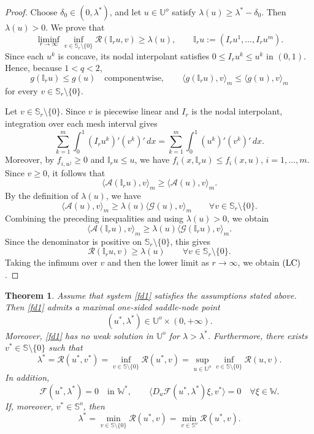 \documentclass[preprint,10pt]{elsarticle}
\numberwithin{equation}{section}
\newtheorem{thm}{Theorem}[section]
\begin{document}
\begin{proof}
	Choose \(\delta_0\in(0,\lambda^*)\), and let
	\(u\in\mathbb U^o\) satisfy \(\lambda(u)\ge\lambda^*-\delta_0\).
	Then \(\lambda(u)>0\). We prove that
	\[
	\liminf_{r\to\infty}
	\inf_{v\in\mathbb S_r\setminus\{0\}}
	\mathcal R(\mathbb I_ru,v)
	\ge\lambda(u),
	\qquad
	\mathbb I_ru:=(I_ru^1,\ldots,I_ru^m).
	\]
	Since each \(u^k\) is concave, its nodal interpolant satisfies
	\(0\le I_ru^k\le u^k\) in \((0,1)\). Hence, because \(1<q<2\),
	\[
	g(\mathbb I_ru)\le g(u)
	\quad\text{componentwise},
	\qquad
	\langle g(\mathbb I_ru),v\rangle_m
	\le
	\langle g(u),v\rangle_m
	\]
	for every \(v\in\mathbb S_r\setminus\{0\}\).
	
	Let \(v\in\mathbb S_r\setminus\{0\}\). Since \(v\) is piecewise linear and
	\(I_r\) is the nodal interpolant, integration over each mesh interval gives
	\[
	\sum_{k=1}^m\int_0^1 (I_ru^k)'(v^k)'\,dx
	=
	\sum_{k=1}^m\int_0^1 (u^k)'(v^k)'\,dx .
	\]
	Moreover, by \(f_{i,u^j}\ge0\) and \(\mathbb I_ru\le u\), we have
	\(f_i(x,\mathbb I_ru)\le f_i(x,u)\), \(i=1,\ldots,m\). Since \(v\ge0\),
	it follows that
	\[
	\langle\mathcal A(\mathbb I_ru),v\rangle_m
	\ge
	\langle\mathcal A(u),v\rangle_m .
	\]
	By the definition of \(\lambda(u)\), we have
	\[
	\langle\mathcal A(u),v\rangle_m
	\ge
	\lambda(u)\langle\mathcal G(u),v\rangle_m
	\qquad
	\forall v\in\mathbb S_r\setminus\{0\}.
	\]
	Combining the preceding inequalities and using \(\lambda(u)>0\), we obtain
	\[
	\langle\mathcal A(\mathbb I_ru),v\rangle_m
	\ge
	\lambda(u)\langle\mathcal G(\mathbb I_ru),v\rangle_m .
	\]
	Since the denominator is positive on \(\mathbb S_r\setminus\{0\}\), this
	gives
	\[
	\mathcal R(\mathbb I_ru,v)\ge\lambda(u)
	\qquad
	\forall v\in\mathbb S_r\setminus\{0\}.
	\]
	Taking the infimum over \(v\) and then the lower limit as \(r\to\infty\),
	we obtain \({\rm (LC)}\).
\end{proof}

\begin{thm}
	\label{Th51}
	Assume that system \eqref{fd1} satisfies the assumptions stated above.
	Then \eqref{fd1} admits a maximal one-sided saddle-node point
	\[
	(u^*,\lambda^*)\in\mathbb U^o\times(0,+\infty).
	\]
	Moreover, \eqref{fd1} has no weak solution in \(\mathbb U^o\) for
	\(\lambda>\lambda^*\). Furthermore, there exists
	\(v^*\in\mathbb S\setminus\{0\}\) such that
	\begin{equation}
		\label{MainBd1}
		\lambda^*
		=
		\mathcal R(u^*,v^*)
		=
		\inf_{v\in\mathbb S\setminus\{0\}}\mathcal R(u^*,v)
		=
		\sup_{u\in\mathbb U^o}
		\inf_{v\in\mathbb S\setminus\{0\}}
		\mathcal R(u,v).
	\end{equation}
	In addition,
	\[
	\mathcal F(u^*,\lambda^*)=0
	\quad\text{in }\mathbb W^*,
	\qquad
	\bigl\langle
	D_u\mathcal F(u^*,\lambda^*)\xi,v^*
	\bigr\rangle=0
	\quad \forall \xi\in\mathbb W .
	\]
	If, moreover, \(v^*\in\mathbb S^o\), then
	\[
	\lambda^*
	=
	\min_{v\in\mathbb S\setminus\{0\}}\mathcal R(u^*,v)
	=
	\min_{v\in\mathbb S^o}\mathcal R(u^*,v).
	\]
\end{thm}
\end{document}
